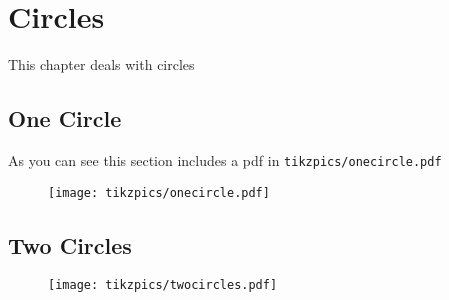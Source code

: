 \documentclass[../main.tex]{subfiles}
\begin{document}
\chapter{Circles}

This chapter deals with circles

\section{One Circle}

As you can see this section includes a pdf in \verb!tikzpics/onecircle.pdf!

\begin{figure}[h!]
    \texttt{[image: tikzpics/onecircle.pdf]}
\end{figure}

\section{Two Circles}

\begin{figure}[h!]
    \texttt{[image: tikzpics/twocircles.pdf]}
\end{figure}
\end{document}
